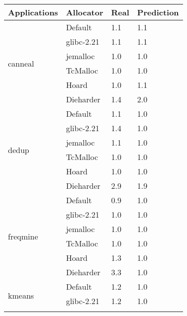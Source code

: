\begin{table}[]
\begin{tabular}{|l|l|l|l|}
\hline
Applications                    & Allocator  & Real & Prediction \\ \hline
\multirow{6}{*}{canneal}        & Default    & 1.1  & 1.1        \\ \cline{2-4} 
                                & glibc-2.21 & 1.1  & 1.1        \\ \cline{2-4} 
                                & jemalloc   & 1.0  & 1.0        \\ \cline{2-4} 
                                & TcMalloc   & 1.0  & 1.0        \\ \cline{2-4} 
                                & Hoard      & 1.0  & 1.1        \\ \cline{2-4} 
                                & Dieharder  & 1.4  & 2.0        \\ \hline
\multirow{6}{*}{dedup}          & Default    & 1.1  & 1.0        \\ \cline{2-4} 
                                & glibc-2.21 & 1.4  & 1.0        \\ \cline{2-4} 
                                & jemalloc   & 1.1  & 1.0        \\ \cline{2-4} 
                                & TcMalloc   & 1.0  & 1.0        \\ \cline{2-4} 
                                & Hoard      & 1.0  & 1.0        \\ \cline{2-4} 
                                & Dieharder  & 2.9  & 1.9        \\ \hline
\multirow{6}{*}{freqmine}       & Default    & 0.9  & 1.0        \\ \cline{2-4} 
                                & glibc-2.21 & 1.0  & 1.0        \\ \cline{2-4} 
                                & jemalloc   & 1.0  & 1.0        \\ \cline{2-4} 
                                & TcMalloc   & 1.0  & 1.0        \\ \cline{2-4} 
                                & Hoard      & 1.3  & 1.0        \\ \cline{2-4} 
                                & Dieharder  & 3.3  & 1.0        \\ \hline
\multirow{6}{*}{kmeans}         & Default    & 1.2  & 1.0        \\ \cline{2-4} 
                                & glibc-2.21 & 1.2  & 1.0        \\ \cline{2-4} 

\end{tabular}
\end{table}
